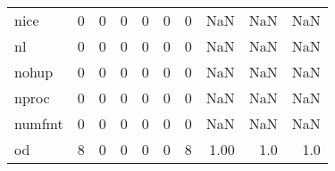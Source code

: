 \begin{longtable}{lrrrrrrrrr}
nice      &                                       0 &                                                  0 &                                                  0 &                                                  0 &                                                  0 &                                                  0 &                                                NaN &                                    NaN &                                  NaN \\
nl        &                                       0 &                                                  0 &                                                  0 &                                                  0 &                                                  0 &                                                  0 &                                                NaN &                                    NaN &                                  NaN \\
nohup     &                                       0 &                                                  0 &                                                  0 &                                                  0 &                                                  0 &                                                  0 &                                                NaN &                                    NaN &                                  NaN \\
nproc     &                                       0 &                                                  0 &                                                  0 &                                                  0 &                                                  0 &                                                  0 &                                                NaN &                                    NaN &                                  NaN \\
numfmt    &                                       0 &                                                  0 &                                                  0 &                                                  0 &                                                  0 &                                                  0 &                                                NaN &                                    NaN &                                  NaN \\
od        &                                       8 &                                                  0 &                                                  0 &                                                  0 &                                                  0 &                                                  8 &                                               1.00 &                                    1.0 &                                  1.0 \\

\end{longtable}
